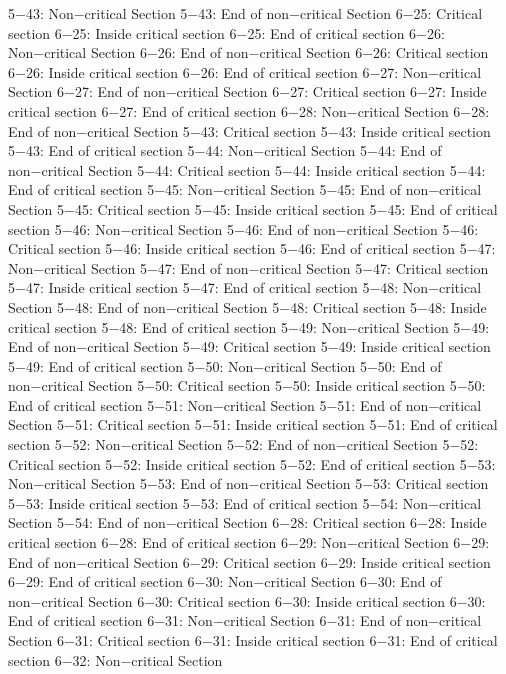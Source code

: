 5−43: Non−critical Section
5−43: End of non−critical Section
6−25: Critical section
6−25: Inside critical section
6−25: End of critical section
6−26: Non−critical Section
6−26: End of non−critical Section
6−26: Critical section
6−26: Inside critical section
6−26: End of critical section
6−27: Non−critical Section
6−27: End of non−critical Section
6−27: Critical section
6−27: Inside critical section
6−27: End of critical section
6−28: Non−critical Section
6−28: End of non−critical Section
5−43: Critical section
5−43: Inside critical section
5−43: End of critical section
5−44: Non−critical Section
5−44: End of non−critical Section
5−44: Critical section
5−44: Inside critical section
5−44: End of critical section
5−45: Non−critical Section
5−45: End of non−critical Section
5−45: Critical section
5−45: Inside critical section
5−45: End of critical section
5−46: Non−critical Section
5−46: End of non−critical Section
5−46: Critical section
5−46: Inside critical section
5−46: End of critical section
5−47: Non−critical Section
5−47: End of non−critical Section
5−47: Critical section
5−47: Inside critical section
5−47: End of critical section
5−48: Non−critical Section
5−48: End of non−critical Section
5−48: Critical section
5−48: Inside critical section
5−48: End of critical section
5−49: Non−critical Section
5−49: End of non−critical Section
5−49: Critical section
5−49: Inside critical section
5−49: End of critical section
5−50: Non−critical Section
5−50: End of non−critical Section
5−50: Critical section
5−50: Inside critical section
5−50: End of critical section
5−51: Non−critical Section
5−51: End of non−critical Section
5−51: Critical section
5−51: Inside critical section
5−51: End of critical section
5−52: Non−critical Section
5−52: End of non−critical Section
5−52: Critical section
5−52: Inside critical section
5−52: End of critical section
5−53: Non−critical Section
5−53: End of non−critical Section
5−53: Critical section
5−53: Inside critical section
5−53: End of critical section
5−54: Non−critical Section
5−54: End of non−critical Section
6−28: Critical section
6−28: Inside critical section
6−28: End of critical section
6−29: Non−critical Section
6−29: End of non−critical Section
6−29: Critical section
6−29: Inside critical section
6−29: End of critical section
6−30: Non−critical Section
6−30: End of non−critical Section
6−30: Critical section
6−30: Inside critical section
6−30: End of critical section
6−31: Non−critical Section
6−31: End of non−critical Section
6−31: Critical section
6−31: Inside critical section
6−31: End of critical section
6−32: Non−critical Section
